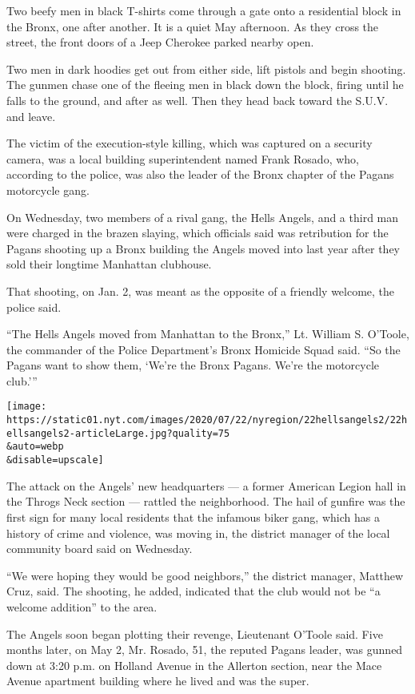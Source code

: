 Two beefy men in black T-shirts come through a gate onto a residential
block in the Bronx, one after another. It is a quiet May afternoon. As
they cross the street, the front doors of a Jeep Cherokee parked nearby
open.

Two men in dark hoodies get out from either side, lift pistols and begin
shooting. The gunmen chase one of the fleeing men in black down the
block, firing until he falls to the ground, and after as well. Then they
head back toward the S.U.V. and leave.

The victim of the execution-style killing, which was captured on a
security camera, was a local building superintendent named Frank Rosado,
who, according to the police, was also the leader of the Bronx chapter
of the Pagans motorcycle gang.

On Wednesday, two members of a rival gang, the Hells Angels, and a third
man were charged in the brazen slaying, which officials said was
retribution for the Pagans shooting up a Bronx building the Angels moved
into last year after they sold their longtime Manhattan clubhouse.

That shooting, on Jan. 2, was meant as the opposite of a friendly
welcome, the police said.

``The Hells Angels moved from Manhattan to the Bronx,'' Lt. William S.
O'Toole, the commander of the Police Department's Bronx Homicide Squad
said. ``So the Pagans want to show them, `We're the Bronx Pagans. We're
the motorcycle club.'''

\texttt{[image: https://static01.nyt.com/images/2020/07/22/nyregion/22hellsangels2/22hellsangels2-articleLarge.jpg?quality=75\\\&auto=webp\\\&disable=upscale]}

The attack on the Angels' new headquarters --- a former American Legion
hall in the Throgs Neck section --- rattled the neighborhood. The hail
of gunfire was the first sign for many local residents that the infamous
biker gang, which has a history of crime and violence, was moving in,
the district manager of the local community board said on Wednesday.

``We were hoping they would be good neighbors,'' the district manager,
Matthew Cruz, said. The shooting, he added, indicated that the club
would not be ``a welcome addition'' to the area.

The Angels soon began plotting their revenge, Lieutenant O'Toole said.
Five months later, on May 2, Mr. Rosado, 51, the reputed Pagans leader,
was gunned down at 3:20 p.m. on Holland Avenue in the Allerton section,
near the Mace Avenue apartment building where he lived and was the
super.

